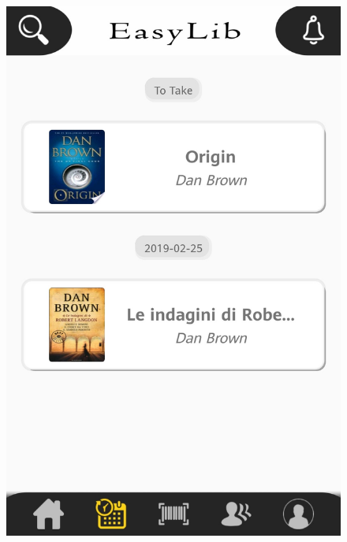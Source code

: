 \begin{figure}[H]
	\centering
	\includegraphics[scale=0.15]{Images/UI/Book/4}
	\hspace{0.5cm}

\end{figure}

